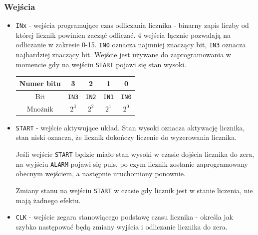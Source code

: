 \documentclass[a4paper]{article}
\begin{document}
\subsubsection{Wejścia}
\begin{itemize}
    \item \verb|INx| - wejścia programujące czas odliczania licznika - binarny zapis liczby od której licznik powinien 
            zacząć odliczać. 4 wejścia łącznie pozwalają na odliczanie w zakresie 0-15. \verb|IN0| oznacza najmniej 
            znaczący bit, \verb|IN3| oznacza najbardziej znaczący bit. Wejście jest używane do zaprogramowania w momencie
            gdy na wejściu \verb|START| pojawi się stan wysoki.
            \begin{center}
                \begin{tabular}{|c|c|c|c|c|}
                  \hline Numer bitu & 3 & 2 & 1 & 0 \\ 
                  \hline Bit & \verb|IN3| & \verb|IN2| & \verb|IN1| & \verb|IN0| \\
                  \hline Mnożnik & $2^3$ & $2^2$ & $2^1$ & $2^0$  \\
                  \hline
                \end{tabular}
              \end{center}

    \item \verb|START| - wejście aktywujące układ. Stan wysoki oznacza aktywację licznika, stan niski oznacza, że licznik 
              dokończy liczenie do wyzerowania licznika.

              Jeśli wejście \verb|START| będzie miało stan wysoki w czasie dojścia licznika do zera, na wyjściu \verb|ALARM|
              pojawi się puls, po czym licznik zostanie zaprogramowany obecnym wejściem, a następnie uruchomiony ponownie.
              
              Zmiany stanu na wejściu \verb|START| w czasie gdy licznik jest w stanie liczenia, nie mają żadnego efektu. 

    \item \verb|CLK| - wejście zegara stanowiącego podstawę czasu licznika - określa jak szybko następować będą zmiany wyjścia
              i odliczanie licznika do zera.
\end{itemize}
\end{document}
